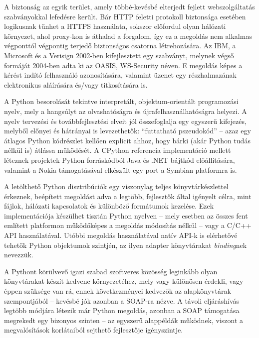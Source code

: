 A biztonság az egyik terület, amely többé-kevésbé elterjedt fejlett webszolgáltatás szabványokkal lefedésre került. Bár HTTP feletti protokoll biztonsága esetében logikusnak tűnhet a HTTPS használata, sokszor előfordul olyan hálózati környezet, ahol proxy-kon is áthalad a forgalom, így ez a megoldás nem alkalmas végponttól végpontig terjedő biztonságos csatorna létrehozására. Az IBM, a Microsoft és a Verisign 2002-ben kifejlesztett egy szabványt, melynek végső formáját 2004-ben adta ki az OASIS, WS\hyp{}Security néven. E megoldás képes a kérést indító felhasználó azonosítására, valamint üzenet egy részhalmazának elektronikus aláírására és/vagy titkosítására is.

\bigskip

A Python besorolását tekintve interpretált, objektum-orientált programozási nyelv, mely a hangsúlyt az olvashatóságra és újrafelhasználhatóságra helyezi. A nyelv tervezési és továbbfejlesztési elveit jól összefoglalja egy egyszerű kifejezés, melyből előnyei és hátrányai is levezethetők: ``futtatható pszeudokód'' -- azaz egy átlagos Python kódrészlet kellően explicit ahhoz, hogy bárki (akár Python tudás nélkül is) átlássa működését. A CPython referencia implementáció mellett léteznek projektek Python forráskódból Java és .NET bájtkód előállítására, valamint a Nokia támogatásával elkészült egy port a Symbian platformra is.

A letölthető Python disztribúciók egy viszonylag teljes könyvtárkészlettel érkeznek, beépített megoldást adva a legtöbb, fejlesztők által igényelt célra, mint fájlok, hálózati kapcsolatok és különböző formátumok kezelése. Ezek implementációja készülhet tisztán Python nyelven -- mely esetben az összes fent említett platformon működőképes a megoldás módosítás nélkül -- vagy a C/C++ API használatával. Utóbbi megoldás használatával natív API-k is elérhetővé tehetők Python objektumok szintjén, az ilyen adapter könyvtárakat \emph{binding}nek nevezzük.

\bigskip

A Pythont körülvevő igazi szabad szoftveres közösség leginkább olyan könyvtárakat készít kedvenc környezetéhez, mely vagy különösen érdekli, vagy éppen szüksége van rá, ennek következményei kedvezők az alapkönyvtárak szempontjából -- kevésbé jók azonban a SOAP-ra nézve. A távoli eljáráshívás legtöbb módjára létezik már Python megoldás, azonban a SOAP támogatása megrekedt egy bizonyos szinten -- az egyszerű alappéldák működnek, viszont a megvalósítások korlátaiból sejthető fejlesztője igényszintje.


